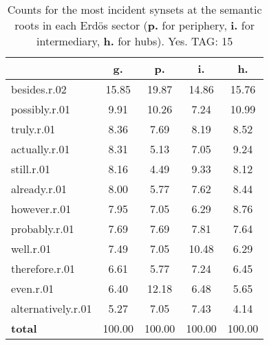 \begin{table}[h!]
\begin{center}
\begin{tabular}{| l | c | c | c | c |}\hline
 & g. & p. & i. & h. \\\hline
besides.r.02 & 15.85  & 19.87  & 14.86  & 15.76 \\\hline
possibly.r.01 & 9.91  & 10.26  & 7.24  & 10.99 \\\hline
truly.r.01 & 8.36  & 7.69  & 8.19  & 8.52 \\\hline
actually.r.01 & 8.31  & 5.13  & 7.05  & 9.24 \\\hline
still.r.01 & 8.16  & 4.49  & 9.33  & 8.12 \\\hline
already.r.01 & 8.00  & 5.77  & 7.62  & 8.44 \\\hline
however.r.01 & 7.95  & 7.05  & 6.29  & 8.76 \\\hline
probably.r.01 & 7.69  & 7.69  & 7.81  & 7.64 \\\hline
well.r.01 & 7.49  & 7.05  & 10.48  & 6.29 \\\hline
therefore.r.01 & 6.61  & 5.77  & 7.24  & 6.45 \\\hline
even.r.01 & 6.40  & 12.18  & 6.48  & 5.65 \\\hline
alternatively.r.01 & 5.27  & 7.05  & 7.43  & 4.14 \\\hline
{{\bf total}} & 100.00  & 100.00  & 100.00  & 100.00 \\\hline
\end{tabular}
\caption{Counts for the most incident synsets at the semantic roots in each Erd\"os sector ({\bf p.} for periphery, {\bf i.} for intermediary, {\bf h.} for hubs). Yes. TAG: 15}
\end{center}
\end{table}